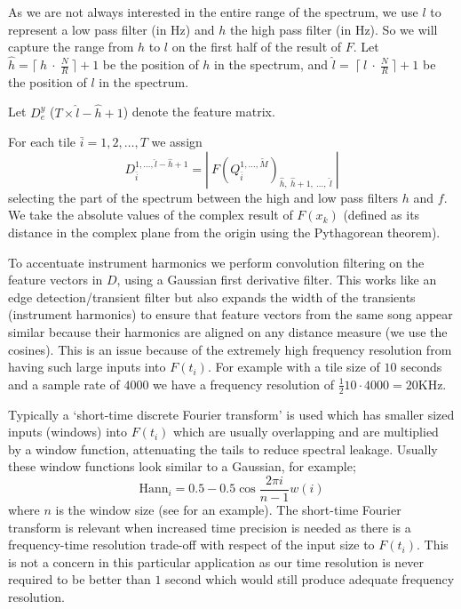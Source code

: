 \documentclass[twocolumn]{article}
\begin{document}
	As we are not always interested in the entire range of the spectrum, we use $l$ to represent a low pass filter (in Hz) and $h$ the high pass filter (in Hz). So we will capture the range from $h$ to $l$ on the first half of the result of $F$. Let $\hat{h} = \lceil~h~\cdot~\frac{{N}}{R} ~\rceil+1$ be the position of $h$ in the spectrum, and $\hat l=~\lceil~l~\cdot~\frac{{N}}{R}~\rceil+1$ be the position of $l$ in the spectrum.
	
	Let $D_e^y$ ($T \times \hat{l}-\hat{h}+1$) denote the feature matrix.
	
	For each tile $\bar{i}=1,2,\ldots,T$ we assign 
\[
D_{\bar{i}}^{1,\ldots,\hat{l}-\hat{h}+1} = \left|~F(Q_{\bar{i}}^{1,\ldots,\tilde{M}})_{\hat{h},~\hat{h}+1,~\ldots,~\hat{l} }~\right|
\]
 selecting the part of the spectrum between the high and low pass filters $h$ and $f$.  We take the absolute values of the complex result of $F(x_k)$ (defined as its distance in the complex plane from the origin using the Pythagorean theorem).
	
	To accentuate instrument harmonics we perform convolution filtering on the feature vectors in $D$, using a Gaussian first derivative filter. This works like an edge detection/transient filter but also expands the width of the transients (instrument harmonics) to ensure that feature vectors from the same song appear similar because their harmonics are aligned on any distance measure (we use the cosines). This is an issue because of the extremely high frequency resolution from having such large inputs into $F(t_i)$. For example with a tile size of $10$ seconds and a sample rate of $4000$ we have a frequency resolution of $\frac{1}{2}10 \cdot 4000 = 20$KHz. 
	
	Typically a `short-time discrete Fourier transform' is used which has smaller sized inputs (windows) into $F(t_i)$ which are usually overlapping and are multiplied by a window function, attenuating the tails to reduce spectral leakage. Usually these window functions look similar to a Gaussian, for example;  
	\[
	\mathrm{Hann}_i = 0.5 - 0.5 \cos\frac{2\pi i}{n-1}{w(i)}
	\] where $n$ is the window size
	(see \cite{tzanetakis1999multifeature} for an example). The short-time Fourier transform is relevant when increased time precision is needed as there is a frequency-time resolution trade-off with respect of the input size to $F(t_i)$. This is not a concern in this particular application as our time resolution is never required to be better than $1$ second which would still produce adequate frequency resolution.
	
\end{document}

